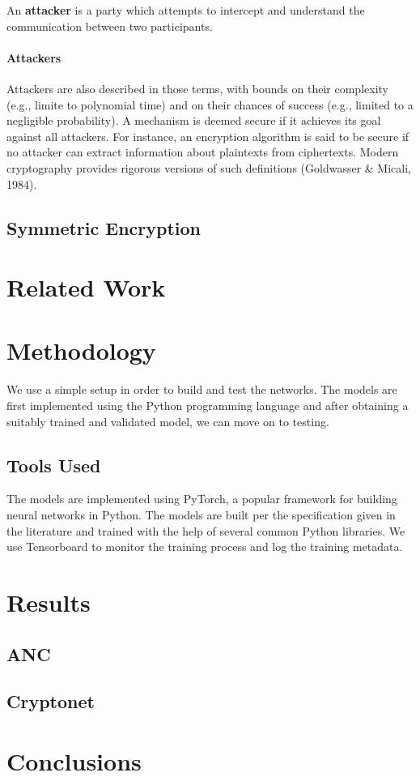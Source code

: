\documentclass{proc}
\begin{document}
    An {\bf attacker} is a party which attempts to intercept and understand the
    communication between two participants.
  
  \paragraph{Attackers}
  Attackers are also described in those terms, with bounds on their complexity 
  (e.g., limite to polynomial time) and on their chances of success 
  (e.g., limited to a negligible probability). A mechanism is deemed secure if 
  it achieves its goal against all attackers. For instance, an encryption
  algorithm is said to be secure if no attacker can extract information about 
  plaintexts from ciphertexts.
  Modern cryptography provides rigorous versions of such definitions 
  (Goldwasser \& Micali, 1984).

    \subsection{Symmetric Encryption}
    

  
  \section{Related Work}
  
  \section{Methodology}
  We use a simple setup in order to build and test the networks. The models are 
  first implemented using the Python programming language and after obtaining a 
  suitably trained and validated model, we can move on to testing. 

    \subsection{Tools Used}
    The models are implemented using PyTorch, a popular framework for building
    neural networks in Python. The models are built per the specification given in
    the literature and trained with the help of several common Python libraries.
    We use Tensorboard to monitor the training process and log the training metadata.

  
  \section{Results}
    \subsection{ANC}
    \subsection{Cryptonet}
  
  \section{Conclusions}

  
  
\end{document}
